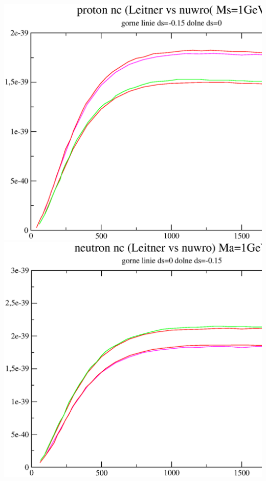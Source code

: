 \documentclass{article}
\begin{document}
\includegraphics[width=1\textwidth]{proton.eps}
\includegraphics[width=1\textwidth]{neutron.eps}
\end{document}
